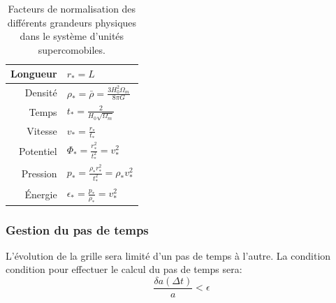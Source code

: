 \begin{table}
\begin{center}
\begin{tabular}{r l} \hline 
Longueur  & $r_*=L$\\ \hline 
Densité & $\rho_* = \bar{\rho} = \frac{3H_0^2 \Omega_m}{8\pi G}$\\ \hline 
Temps & $t_* = \frac{2}{H_0 \sqrt{\Omega_m}}$\\ \hline 
Vitesse & $v_* = \frac{r_*}{t_*}$\\ \hline 
Potentiel & $\Phi_* = \frac{r_*^2}{t_*^2} = v_*^2$\\ \hline 
Pression & $p_* = \frac{\rho_* r_*^2}{t_*^2} = \rho_* v_*^2$\\ \hline 
Énergie & $\epsilon_* = \frac{p_*}{\rho_*} = v_*^2$\\ \hline 
\end{tabular} 
\end{center}
\caption[Facteurs de normalisation]{Facteurs de normalisation des différents grandeurs physiques dans le système d'unités supercomobiles.
\label{tab:comobilfact}}
\end{table}

\subsubsection{Gestion du pas de temps}
\label{sec:dtcosmo}
L'évolution de la grille sera limité d'un pas de temps à l'autre.
La condition condition pour effectuer le calcul du pas de temps sera:
\begin{equation}
\frac{\delta a (\Delta t) } {a} < \epsilon
\end{equation}

